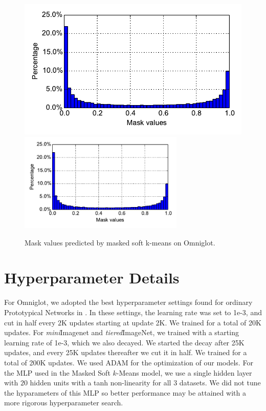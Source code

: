 \begin{figure}
    \centering
    \iflatexml
    \includegraphics[width=4\textwidth]{figures/mask_histo_omniglot_refinement.pdf}
    \else
    \includegraphics[width=0.7\textwidth]{figures/mask_histo_omniglot_refinement.pdf}
    \fi
    \caption{Mask values predicted by masked soft k-means on Omniglot.}
    \label{fig:histo}
\end{figure}

\section{Hyperparameter Details}
\label{sec:hyperparam}
For Omniglot, we adopted the best hyperparameter settings found for ordinary Prototypical Networks
in \cite{snell2017protonet}. In these settings, the learning rate was set to 1e-3, and cut in half
every $2$K updates starting at update 2K. We trained for a total of 20K updates. For
\textit{mini}Imagenet and \textit{tiered}ImageNet, we trained with a starting learning rate of 1e-3,
which we also decayed. We started the decay after 25K updates, and every 25K updates thereafter we
cut it in half. We trained for a total of 200K updates. We used ADAM \citep{kingma2014adam} for the
optimization of our models. For the MLP used in the Masked Soft $k$-Means model, we use a single
hidden layer with $20$ hidden units with a tanh non-linearity for all $3$ datasets. We did not tune
the hyparameters of this MLP so better performance may be attained with a more rigorous
hyperparameter search.
